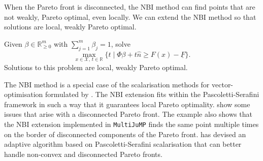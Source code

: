 \documentclass[main.tex]{subfiles}
\begin{document}
When the Pareto front is disconnected, the NBI method can find
points that are not weakly, Pareto optimal, even locally.
We can extend the NBI method so that solutions are local, weakly
Pareto optimal.
\begin{mydef}
  Given $\beta\in\mathbb{R}_{\geq 0}^m$ with $\sum_{j=1}^m\beta_j=1$,
  solve
  \begin{equation}
    \max_{x\in\mathcal{X},\,t\in\mathbb{R}} \{t \mid \Phi\beta +
    t\hat{n} \geq F(x) - \underline{F}\}.
  \end{equation}
  Solutions to this problem are local, weakly Pareto optimal.
\end{mydef}

The NBI method is a special case of the
scalarisation methods for vector-optimisation formulated by
\citet{pascoletti1984scalarizing}. The NBI extension
fits within the Pascoletti-Serafini framework in such a way that it guarantees
local Pareto optimality.  show some issues that
arise with a disconnected Pareto front.
The example also shows that the NBI extension implemented in
\texttt{MultiJuMP} finds the same point multiple times on the border
of disconnected components of the Pareto front.
\citet{eichfelder2009adaptive} has devised an
adaptive algorithm based on Pascoletti-Serafini scalarisation that can
better handle non-convex and disconnected Pareto fronts.
\end{document}
